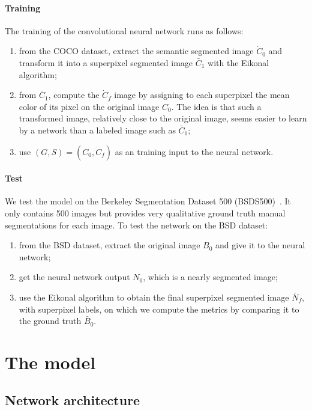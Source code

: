 \documentclass{article}
\begin{document}
        \paragraph{Training} The training of the convolutional neural network runs as follows:
        \begin{enumerate}
            \item from the COCO dataset, extract the semantic segmented image $\dot C_0$ and transform it into a superpixel segmented image $\bar C_1$ with the Eikonal algorithm;
            \item from $\bar C_1$, compute the $\dot C_f$ image by assigning to each superpixel the mean color of its pixel on the original image $C_0$. The idea is that such a transformed image, relatively close to the original image, seems easier to learn by a network than a labeled image such as $\bar C_1$;
            \item use $(G,S)=(C_0, \dot C_f)$ as an training input to the neural network.
        \end{enumerate}
        \paragraph{Test} We test the model on the Berkeley Segmentation Dataset 500 (BSDS500)~\cite{arbelaez2011}. It only contains 500 images but provides very qualitative ground truth manual segmentations for each image. To test the network on the BSD dataset:
        \begin{enumerate}
            \item from the BSD dataset, extract the original image $B_0$ and give it to the neural network;
            \item get the neural network output $N_0$, which is a nearly segmented image;
            \item use the Eikonal algorithm to obtain the final superpixel segmented image $\bar N_f$, with superpixel labels, on which we compute the metrics by comparing it to the ground truth $\bar B_0$.
        \end{enumerate}



\section{The model}
    \subsection{Network architecture}
\end{document}
